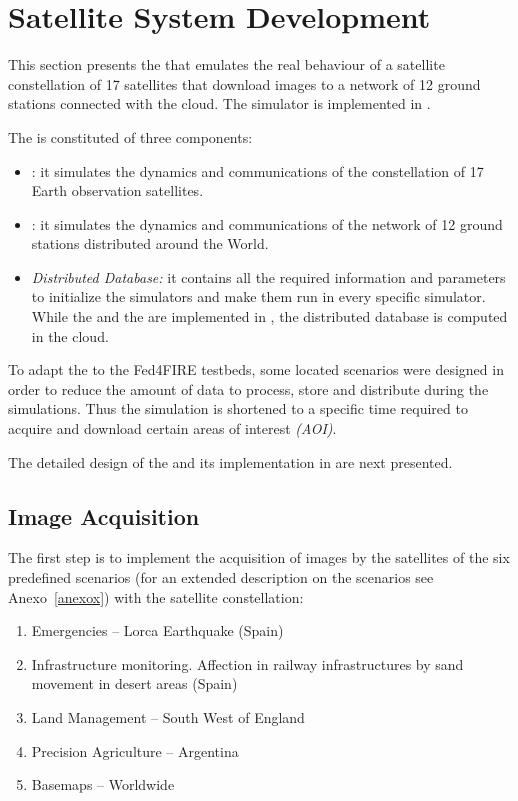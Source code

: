 \section{Satellite System Development}
\label{sec:spaceSystemSimulator}

This section presents the \sss that emulates the real behaviour of a satellite constellation of 17 satellites that download images to a network of 12 ground stations connected with the \bonfire cloud. The simulator is implemented in \vw.

The \sss is constituted of three components:
\begin{itemize}
\item \satss: it simulates the dynamics and communications of the constellation of 17 Earth observation satellites.
\item \gsss: it simulates the dynamics and communications of the network of 12 ground stations distributed around the World.
\item \emph{Distributed Database:} it contains all the required information and parameters to initialize the simulators and make them run in every specific simulator.
While the \satss and the \gsss are implemented in \vw, the distributed database
is computed in the \bonfire cloud.
\end{itemize}

To adapt the \sss to the Fed4FIRE testbeds, some located scenarios were designed in order to reduce the amount of data to process, store and distribute during the simulations. Thus the simulation is shortened to a specific time required to acquire and download certain areas of interest \emph{(AOI)}.

The detailed design of the \sss and its implementation in \vw are next presented.

\subsection{Image Acquisition}
\label{sec:image-acquisition}

The first step is to implement the acquisition of images by the satellites of
the six predefined scenarios (for an extended description on the scenarios see
Anexo~\ref{anexox}) with the satellite
constellation:

\begin{enumerate}
\item Emergencies – Lorca Earthquake (Spain)
\item  Infrastructure monitoring. Affection in railway infrastructures by sand movement in desert areas (Spain)
\item Land Management – South West of England
\item Precision Agriculture – Argentina
\item Basemaps – Worldwide
\end{enumerate}

